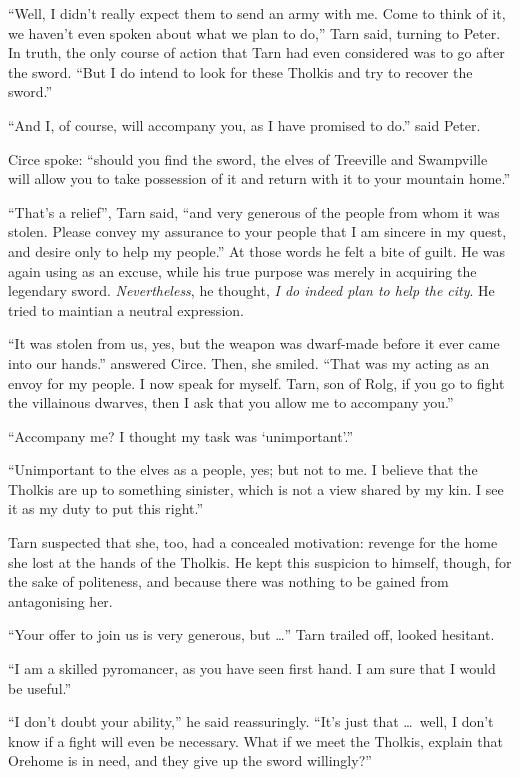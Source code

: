 ``Well, I didn't really expect them to send an army with me.  Come to think of it, we haven't even spoken about what we plan to do,'' Tarn said, turning to Peter.  In truth, the only course of action that Tarn had even considered was to go after the sword.  ``But I do intend to look for these Tholkis and try to recover the sword.''

``And I, of course, will accompany you, as I have promised to do.'' said Peter.

Circe spoke: ``should you find the sword, the elves of Treeville and Swampville will allow you to take possession of it and return with it to your mountain home.''

``That's a relief'', Tarn said, ``and very generous of the people from whom it was stolen.  Please convey my assurance to your people that I am sincere in my quest, and desire only to help my people.''  At those words he felt a bite of guilt.  He was again using \korbarthrond as an excuse, while his true purpose was merely in acquiring the legendary sword.  \emph{Nevertheless}, he thought, \emph{I do indeed plan to help the city}.  He tried to maintian a neutral expression.

``It was stolen from us, yes, but the weapon was dwarf-made before it ever came into our hands.'' answered Circe.  Then, she smiled.  ``That was my acting as an envoy for my people.  I now speak for myself.  Tarn, son of Rolg, if you go to fight the villainous dwarves, then I ask that you allow me to accompany you.''

``Accompany me?  I thought my task was `unimportant'.''

``Unimportant to the elves as a people, yes; but not to me.  I believe that the Tholkis are up to something sinister, which is not a view shared by my kin.  I see it as my duty to put this right.''

Tarn suspected that she, too, had a concealed motivation: revenge for the home she lost at the hands of the Tholkis.  He kept this suspicion to himself, though, for the sake of politeness, and because there was nothing to be gained from antagonising her.

``Your offer to join us is very generous, but \ldots'' Tarn trailed off, looked hesitant.

``I am a skilled pyromancer, as you have seen first hand.  I am sure that I would be useful.''

``I don't doubt your ability,'' he said reassuringly.  ``It's just that \ldots\ well, I don't know if a fight will even be necessary.  What if we meet the Tholkis, explain that Orehome is in need, and they give up the sword willingly?''

